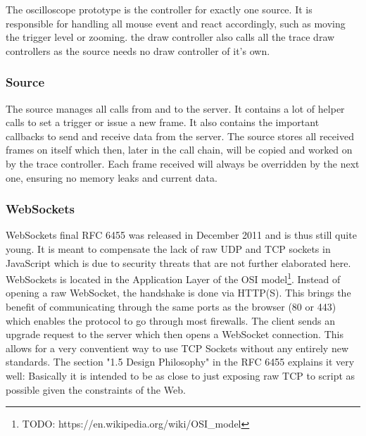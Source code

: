 The oscilloscope prototype is the controller for exactly one source. It is responsible for handling all mouse event and react accordingly, such as moving the trigger level or zooming.
the draw controller also calls all the trace draw controllers as the source needs no draw controller of it's own.

\subsubsection*{Source}

The source manages all calls from and to the server. It contains a lot of helper calls to set a trigger or issue a new frame.
It also contains the important callbacks to send and receive data from the server.
The source stores all received frames on itself which then, later in the call chain, will be copied and worked on by the trace controller.
Each frame received will always be overridden by the next one, ensuring no memory leaks and current data.

%
%

\subsubsection{WebSockets}

WebSockets final RFC 6455\cite{TODO: https://tools.ietf.org/html/rfc6455,} was released in December 2011 and is thus still quite young. It is meant to compensate the lack of raw UDP and TCP sockets in JavaScript which is due to security threats that are not further elaborated here.
WebSockets is located in the Application Layer of the OSI model\footnote{TODO: https://en.wikipedia.org/wiki/OSI\_model}.
Instead of opening a raw WebSocket, the handshake is done via HTTP(S). This brings the benefit of communicating through the same ports as the browser (80 or 443) which enables the protocol to go through most firewalls.
The client sends an upgrade request to the server which then opens a WebSocket connection.
This allows for a very conventient way to use TCP Sockets without any entirely new standards.
The section "1.5 Design Philosophy" in the RFC 6455\cite{TODO: https://tools.ietf.org/html/rfc6455,} explains it very well:
Basically it is intended to be as close to just exposing raw TCP to script as possible given the constraints of the Web.


